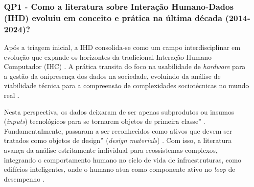 \documentclass[
	12pt,				%
	oneside,			%
	a4paper,			%
	english,			%
	brazil				%
	]{abntex2ppgsi}
\begin{document}
   
    \subsubsection{QP1 - Como a literatura sobre Interação Humano-Dados (IHD) evoluiu em conceito e prática na última década (2014-2024)?}

   Após a triagem inicial, a IHD consolida-se como um campo interdisciplinar em evolução que expande os horizontes da tradicional Interação Humano-Computador (IHC) . A prática transita do foco na usabilidade de \textit{hardware} para a gestão da onipresença dos dados na sociedade, evoluindo da análise de viabilidade técnica para a compreensão de complexidades sociotécnicas no mundo real \cite{sailaja2021exploring}.
   
    Nesta perspectiva, os dados deixaram de ser apenas subprodutos ou insumos (\textit{inputs}) tecnológicos para se tornarem objetos de primeira classe'' \cite{Raj2023, Crabtree2021, Koesten2020}. Fundamentalmente, passaram a ser reconhecidos como ativos que devem ser tratados como objetos de design'' (\textit{design materials}) \cite{seidelin2020foregrounding}. Com isso, a literatura avança da análise estritamente individual para ecossistemas complexos, integrando o comportamento humano no ciclo de vida de infraestruturas, como edifícios inteligentes, onde o humano atua como componente ativo no \textit{loop} de desempenho \cite{bavaresco2019technological}.
    
\end{document}

